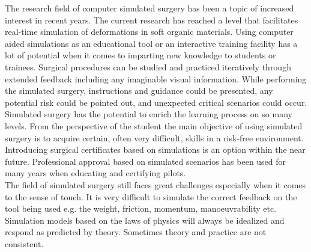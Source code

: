 

The research field of computer simulated surgery has been a
topic of increased interest in recent years.
%
The current research has reached a level that facilitates
real-time simulation of deformations in soft organic materials. 
Using computer aided simulations as an educational
tool or an interactive training facility has a lot of potential when
it comes to imparting new knowledge to students or
trainees. Surgical procedures can be studied and practiced iteratively
through extended feedback including any imaginable visual
information. While performing the simulated surgery, instructions and
guidance could be presented, any potential risk could be pointed out,
and unexpected critical scenarios could occur. 
Simulated surgery has the potential to enrich the
learning process on so many levels.  
%
From the perspective of
the student the main objective of using simulated surgery is to
acquire certain, often very difficult, skills in a risk-free
environment. Introducing surgical certificates based
on simulations is an option within the near future. Professional approval
based on simulated scenarios has been used for many years when
educating and certifying pilots. \\

The field of simulated surgery still faces great
challenges especially when it comes to the sense of touch. It is
very difficult to simulate the correct feedback on the tool being
used e.g. the weight, friction, momentum, manoeuvrability
etc. Simulation models based on the laws of physics will
always be idealized and respond as predicted by theory. Sometimes
theory and practice are not consistent. \\
%

